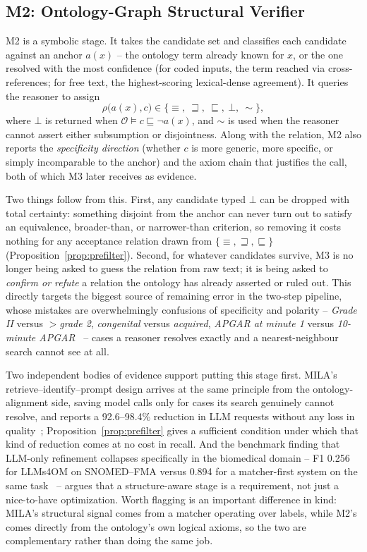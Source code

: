 \documentclass[conference]{IEEEtran}
\newcommand{\onto}{\mathcal{O}}
\newcommand{\rel}{\rho}
\begin{document}
\subsection{M2: Ontology-Graph Structural Verifier}

M2 is a symbolic stage. It takes the candidate set and classifies each candidate against an anchor $a(x)$ -- the ontology term already known for $x$, or the one resolved with the most confidence (for coded inputs, the term reached via cross-references; for free text, the highest-scoring lexical-dense agreement). It queries the reasoner to assign
\begin{equation}
\rel\big(a(x), c\big) \in \{\equiv,\ \sqsupseteq,\ \sqsubseteq,\ \bot,\ \sim\},
\end{equation}
where $\bot$ is returned when $\onto \models c \sqsubseteq \neg a(x)$, and $\sim$ is used when the reasoner cannot assert either subsumption or disjointness. Along with the relation, M2 also reports the \emph{specificity direction} (whether $c$ is more generic, more specific, or simply incomparable to the anchor) and the axiom chain that justifies the call, both of which M3 later receives as evidence.

Two things follow from this. First, any candidate typed $\bot$ can be dropped with total certainty: something disjoint from the anchor can never turn out to satisfy an equivalence, broader-than, or narrower-than criterion, so removing it costs nothing for any acceptance relation drawn from $\{\equiv, \sqsupseteq, \sqsubseteq\}$ (Proposition~\ref{prop:prefilter}). Second, for whatever candidates survive, M3 is no longer being asked to guess the relation from raw text; it is being asked to \emph{confirm or refute} a relation the ontology has already asserted or ruled out. This directly targets the biggest source of remaining error in the two-step pipeline, whose mistakes are overwhelmingly confusions of specificity and polarity -- \emph{Grade II} versus \emph{$>$grade 2}, \emph{congenital} versus \emph{acquired}, \emph{APGAR at minute 1} versus \emph{10-minute APGAR}~\cite{b1} -- cases a reasoner resolves exactly and a nearest-neighbour search cannot see at all.

Two independent bodies of evidence support putting this stage first. MILA's retrieve--identify--prompt design arrives at the same principle from the ontology-alignment side, saving model calls only for cases its search genuinely cannot resolve, and reports a 92.6--98.4\% reduction in LLM requests without any loss in quality~\cite{b54}; Proposition~\ref{prop:prefilter} gives a sufficient condition under which that kind of reduction comes at no cost in recall. And the benchmark finding that LLM-only refinement collapses specifically in the biomedical domain -- F1 0.256 for LLMs4OM on SNOMED--FMA versus 0.894 for a matcher-first system on the same task~\cite{b56,b54} -- argues that a structure-aware stage is a requirement, not just a nice-to-have optimization. Worth flagging is an important difference in kind: MILA's structural signal comes from a matcher operating over labels, while M2's comes directly from the ontology's own logical axioms, so the two are complementary rather than doing the same job.
\end{document}
